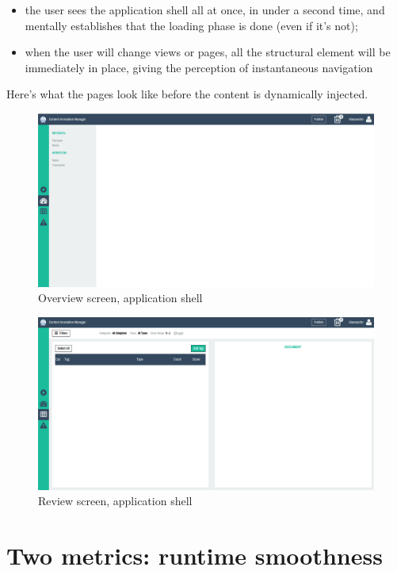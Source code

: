 \documentclass[12pt,oneside,svgnames]{memoir}
\begin{document}
\begin{itemize}
\itemsep1pt\parskip0pt
\item
  the user sees the application shell all at once, in under a second
  time, and mentally establishes that the loading phase is done (even if
  it's not);
\item
  when the user will change views or pages, all the structural element
  will be immediately in place, giving the perception of instantaneous
  navigation
\end{itemize}

Here's what the pages look like before the content is dynamically
injected.

\begin{figure}[htbp]
\centering
\includegraphics{./src/img/overview-appshell.png}
\caption{Overview screen, application shell}
\end{figure}

\begin{figure}[htbp]
\centering
\includegraphics{./src/img/review-appshell.png}
\caption{Review screen, application shell}
\end{figure}

\section{Two metrics: runtime
smoothness}\label{two-metrics-runtime-smoothness}
\end{document}
